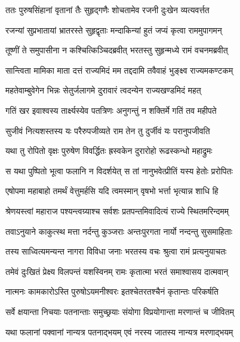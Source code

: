
\twolineshloka
{ततः पुरुषसिंहानां वृतानां तैः सुहृद्गणैः}
{शोचतामेव रजनी दुःखेन व्यत्यवर्त्तत} %

\twolineshloka
{रजन्यां सुप्रभातायां भ्रातरस्ते सुहृद्वृताः}
{मन्दाकिन्यां हुतं जप्यं कृत्वा राममुपागमन्} %

\twolineshloka
{तूष्णीं ते समुपासीना न कश्चित्किञ्चिदब्रवीत्}
{भरतस्तु सुहृन्मध्ये रामं वचनमब्रवीत्} %

\twolineshloka
{सान्त्विता मामिका माता दत्तं राज्यमिदं मम}
{तद्ददामि तवैवाहं भुङ्क्ष्व राज्यमकण्टकम्} %

\twolineshloka
{महतेवाम्बुवेगेन भिन्नः सेतुर्जलागमे}
{दुरावारं त्वदन्येन राज्यखण्डमिदं महत्} %

\twolineshloka
{गतिं खर इवाश्वस्य तार्क्ष्यस्येव पतत्रिणः}
{अनुगन्तुं न शक्तिर्मे गतिं तव महीपते} %

\twolineshloka
{सुजीवं नित्यशस्तस्य यः परैरुपजीव्यते}
{राम तेन तु दुर्जीवं यः परानुपजीवति} %

\twolineshloka
{यथा तु रोपितो वृक्षः पुरुषेण विवर्द्धितः}
{ह्रस्वकेन दुरारोहो रूढस्कन्धो महाद्रुमः} %

\twolineshloka
{स यथा पुष्पितो भूत्वा फलानि न विदर्शयेत्}
{स तां नानुभवेत्प्रीतिं यस्य हेतोः प्ररोपितः} %

\twolineshloka
{एषोपमा महाबाहो तमर्थं वेत्तुमर्हसि}
{यदि त्वमस्मान् वृषभो भर्त्ता भृत्यान्न शाधि हि} %

\twolineshloka
{श्रेणयस्त्वां महाराज पश्यन्त्वग्र्याश्च सर्वशः}
{प्रतपन्तमिवादित्यं राज्ये स्थितमरिन्दमम्} %

\twolineshloka
{तवाऽनुयाने काकुत्स्थ मत्ता नर्दन्तु कुञ्जराः}
{अन्तःपुरगता नार्यो नन्दन्तु सुसमाहिताः} %

\twolineshloka
{तस्य साध्वित्यमन्यन्त नागरा विविधा जनाः}
{भरतस्य वचः श्रुत्वा रामं प्रत्यनुयाचतः} %

\twolineshloka
{तमेवं दुःखितं प्रेक्ष्य विलपन्तं यशस्विनम्}
{रामः कृतात्मा भरतं समाश्वासय दात्मवान्} %

\twolineshloka
{नात्मनः कामकारोऽस्ति पुरुषोऽयमनीश्वरः}
{इतश्चेतरतश्चैनं कृतान्तः परिकर्षति} %

\twolineshloka
{सर्वे क्षयान्ता निचयाः पतनान्ताः समुच्छ्रयाः}
{संयोगा विप्रयोगान्ता मरणान्तं च जीवितम्} %

\twolineshloka
{यथा फलानां पक्वानां नान्यत्र पतनाद्भयम्}
{एवं नरस्य जातस्य नान्यत्र मरणाद्भयम्} %

